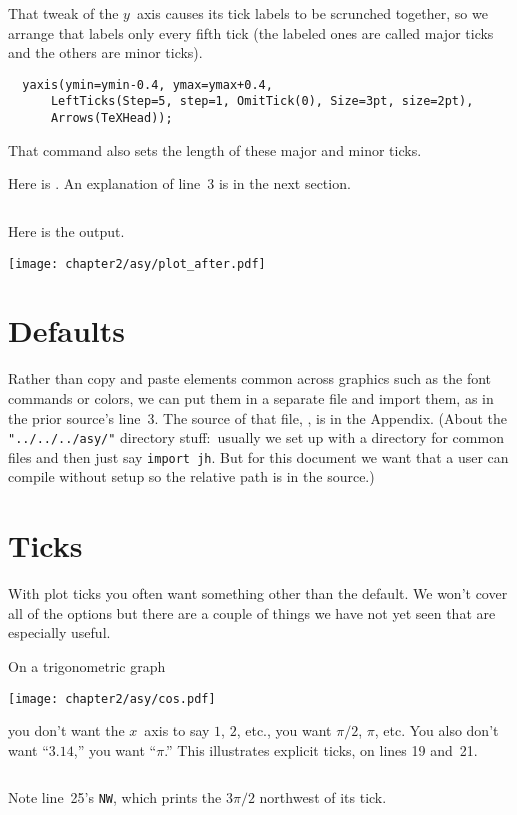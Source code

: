 That tweak of the $y$~axis causes its tick labels to be scrunched together,
so we arrange that \Asy{} labels only every fifth tick
(the labeled ones are called major ticks and the others are minor ticks). 
\begin{verbatim}
  yaxis(ymin=ymin-0.4, ymax=ymax+0.4,
      LeftTicks(Step=5, step=1, OmitTick(0), Size=3pt, size=2pt),
      Arrows(TeXHead));
\end{verbatim}
That command also sets the length of these major and minor ticks.

Here is . 
An explanation of line~3 is in the next section.
\begin{center}
  \inputminted{Asymptote}{chapter2/asy/plot_after.asy}
\end{center}
Here is the output.
\begin{center}
  \texttt{[image: chapter2/asy/plot\_after.pdf]}
\end{center}



\section{Defaults}
Rather than copy and paste elements common across graphics 
such as the font commands or colors,
we can put them in a separate file and import them,
as in the prior source's line~3.
The source of that file, , is in the Appendix.
(About the
\texttt{"../../../asy/"} 
directory stuff:~usually we set up \Asy{} with a directory for common files
and then just say \texttt{import jh}.
But for this document we want that a user can compile without setup
so the relative path is in the source.)



\section{Ticks}
With plot ticks you often want something other
than the default.
We won't cover all of the options but there are a couple of things we have
not yet seen that are especially useful.

On a trigonometric graph
\begin{center}
  \texttt{[image: chapter2/asy/cos.pdf]}
\end{center}
you don't want the $x$~axis to say $1$, $2$, etc.,
you want $\pi/2$, $\pi$, etc.
You also don't want ``$3.14$,'' you want ``$\pi$.''
This illustrates explicit ticks, on lines 19 and~21.
\begin{center}
  \inputminted{Asymptote}{chapter2/asy/cos.asy}
\end{center}
Note line~25's \texttt{NW}, which prints
the $3\pi/2$ northwest of its tick. 

